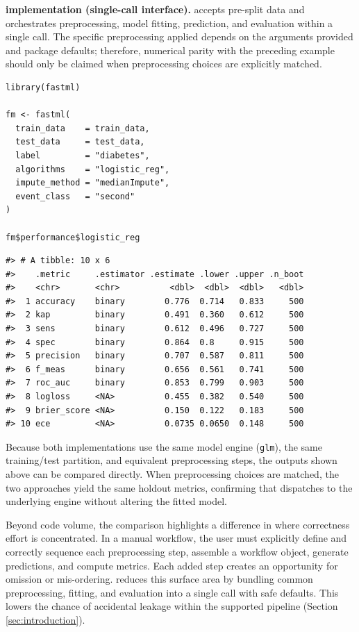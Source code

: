 \textbf{ implementation (single-call interface).}
 accepts pre-split data and orchestrates preprocessing, model fitting, prediction, and evaluation within a single call. The specific preprocessing applied depends on the arguments provided and package defaults; therefore, numerical parity with the preceding  example should only be claimed when preprocessing choices are explicitly matched.

\begin{verbatim}
library(fastml)

fm <- fastml(
  train_data    = train_data,
  test_data     = test_data,
  label         = "diabetes",
  algorithms    = "logistic_reg",
  impute_method = "medianImpute",
  event_class   = "second"
)

fm$performance$logistic_reg
\end{verbatim}

\begin{verbatim}
#> # A tibble: 10 x 6
#>    .metric     .estimator .estimate .lower .upper .n_boot
#>    <chr>       <chr>          <dbl>  <dbl>  <dbl>   <dbl>
#>  1 accuracy    binary        0.776  0.714   0.833     500
#>  2 kap         binary        0.491  0.360   0.612     500
#>  3 sens        binary        0.612  0.496   0.727     500
#>  4 spec        binary        0.864  0.8     0.915     500
#>  5 precision   binary        0.707  0.587   0.811     500
#>  6 f_meas      binary        0.656  0.561   0.741     500
#>  7 roc_auc     binary        0.853  0.799   0.903     500
#>  8 logloss     <NA>          0.455  0.382   0.540     500
#>  9 brier_score <NA>          0.150  0.122   0.183     500
#> 10 ece         <NA>          0.0735 0.0650  0.148     500
\end{verbatim}

Because both implementations use the same model engine (\texttt{glm}), the same training/test partition, and equivalent preprocessing steps, the outputs shown above can be compared directly. When preprocessing choices are matched, the two approaches yield the same holdout metrics, confirming that  dispatches to the underlying  engine without altering the fitted model.

Beyond code volume, the comparison highlights a difference in where correctness effort is concentrated. In a manual  workflow, the user must explicitly define and correctly sequence each preprocessing step, assemble a workflow object, generate predictions, and compute metrics. Each added step creates an opportunity for omission or mis-ordering.  reduces this surface area by bundling common preprocessing, fitting, and evaluation into a single call with safe defaults. This lowers the chance of accidental leakage within the supported pipeline (Section \ref{sec:introduction}).

